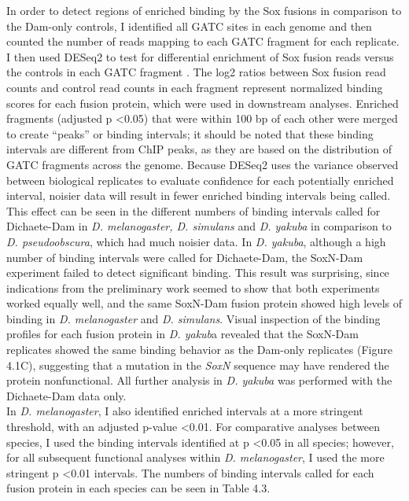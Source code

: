 In order to detect regions of enriched binding by the Sox fusions in comparison to the Dam-only controls, I identified all GATC sites in each genome and then counted the number of reads mapping to each GATC fragment for each replicate. I then used DESeq2 to test for differential enrichment of Sox fusion reads versus the controls in each GATC fragment \citep{love_moderated_2014}. The log2 ratios between Sox fusion read counts and control read counts in each fragment represent normalized binding scores for each fusion protein, which were used in downstream analyses. Enriched fragments (adjusted p \textless 0.05) that were within 100 bp of each other were merged to create “peaks” or binding intervals; it should be noted that these binding intervals are different from ChIP peaks, as they are based on the distribution of GATC fragments across the genome. Because DESeq2 uses the variance observed between biological replicates to evaluate confidence for each potentially enriched interval, noisier data will result in fewer enriched binding intervals being called. This effect can be seen in the different numbers of binding intervals called for Dichaete-Dam in \emph{D. melanogaster, D. simulans} and \emph{D. yakuba} in comparison to \emph{D. pseudoobscura}, which had much noisier data. In \emph{D. yakuba}, although a high number of binding intervals were called for Dichaete-Dam, the SoxN-Dam experiment failed to detect significant binding. This result was surprising, since indications from the preliminary work seemed to show that both experiments worked equally well, and the same SoxN-Dam fusion protein showed high levels of binding in \emph{D. melanogaster} and \emph{D. simulans}. Visual inspection of the binding profiles for each fusion protein in \emph{D. yakub}a revealed that the SoxN-Dam replicates showed the same binding behavior as the Dam-only replicates (Figure 4.1C), suggesting that a mutation in the \emph{SoxN} sequence may have rendered the protein nonfunctional. All further analysis in \emph{D. yakuba} was performed with the Dichaete-Dam data only.\\

In \emph{D. melanogaster}, I also identified enriched intervals at a more stringent threshold, with an adjusted p-value \textless 0.01. For comparative analyses between species, I used the binding intervals identified at p \textless 0.05 in all species; however, for all subsequent functional analyses within \emph{D. melanogaster}, I used the more stringent p \textless 0.01 intervals. The numbers of binding intervals called for each fusion protein in each species can be seen in Table 4.3.\\

